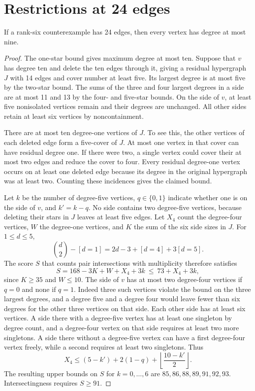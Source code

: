 \section{Restrictions at 24 edges}

\begin{proposition}
If a rank-six counterexample has 24 edges, then every vertex has
degree at most nine.
\end{proposition}

\begin{proof}
The one-star bound gives maximum degree at most ten. Suppose
that $v$ has degree ten and delete the ten edges through it, giving
a residual hypergraph $J$ with 14 edges and cover number at least five.
Its largest degree is at most five by the two-star bound. The sums
of the three and four largest degrees in a side are at most 11 and
13 by the four- and five-star bounds. On the side of $v$, at least
five nonisolated vertices remain and their degrees are unchanged.
All other sides retain at least six vertices by noncontainment.

There are at most ten degree-one vertices of $J$. To see this, the
other vertices of each deleted edge form a five-cover of $J$. At
most one vertex in that cover can have residual degree one. If
there were two, a single vertex could cover their at most two edges
and reduce the cover to four. Every residual degree-one vertex
occurs on at least one deleted edge because its degree in the
original hypergraph was at least two. Counting these incidences gives
the claimed bound.

Let $k$ be the number of degree-five vertices, $q\in\{0,1\}$
indicate whether one is on the side of $v$, and $k'=k-q$.
No side contains two degree-five vertices, because deleting their
stars in $J$ leaves at least five edges. Let $X_4$ count the
degree-four vertices, $W$ the degree-one vertices, and $K$ the sum
of the six side sizes in $J$. For $1\le d\le5$,
\[
 \binom d2-[d=1]=2d-3+[d=4]+3[d=5].
\]
The score $S$ that counts pair intersections with multiplicity
therefore satisfies
\[
 S=168-3K+W+X_4+3k\ \leq\ 73+X_4+3k,
\]
since $K\ge35$ and $W\le10$.
The side of $v$ has at most two degree-four vertices if $q=0$
and none if $q=1$. Indeed three such vertices violate the bound on
the three largest degrees, and a degree five and a degree four
would leave fewer than six degrees for the other three vertices
on that side. Each other side has at least six vertices. A side
there with a degree-five vertex has at least one singleton by
degree count, and a degree-four vertex on that side requires at
least two more singletons. A side there without a degree-five
vertex can have a first degree-four vertex freely, while a second
requires at least two singletons. Thus
\[
 X_4\le (5-k')+2(1-q)+\left\lfloor\frac{10-k'}2\right\rfloor.
\]
The resulting upper bounds on $S$ for $k=0,\ldots,6$ are
$85,86,88,89,91,92,93$. Intersectingness requires $S\ge91$.


\end{proof}
